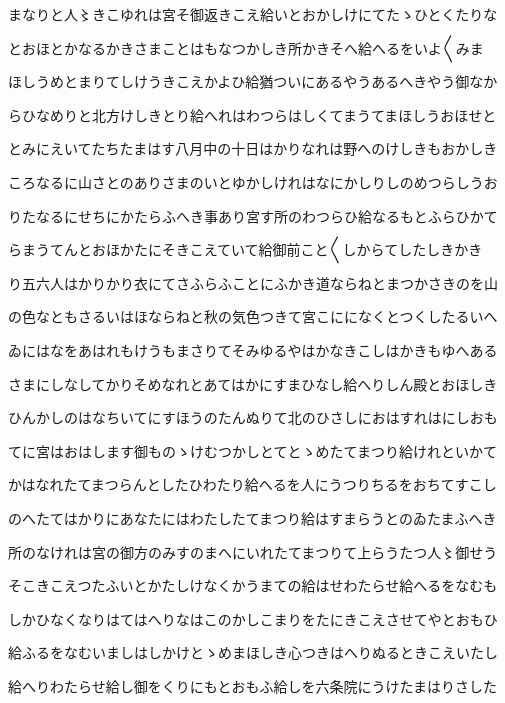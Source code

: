 \documentclass[a4paper,11pt,landscape]{ltjtarticle}
\begin{document}
\par\medskip
まなりと人〻きこゆれは宮そ御返きこえ給いとおかしけにてたゝひとくたりな
\par\medskip
とおほとかなるかきさまことはもなつかしき所かきそへ給へるをいよ〱みま
\par\medskip
ほしうめとまりてしけうきこえかよひ給猶ついにあるやうあるへきやう御なか
\par\medskip
らひなめりと北方けしきとり給へれはわつらはしくてまうてまほしうおほせと
\par\medskip
とみにえいてたちたまはす八月中の十日はかりなれは野へのけしきもおかしき
\par\medskip
ころなるに山さとのありさまのいとゆかしけれはなにかしりしのめつらしうお
\par\medskip
りたなるにせちにかたらふへき事あり宮す所のわつらひ給なるもとふらひかて
\par\medskip
らまうてんとおほかたにそきこえていて給御前こと〱しからてしたしきかき
\par\medskip
り五六人はかりかり衣にてさふらふことにふかき道ならねとまつかさきのを山
\par\medskip
の色なともさるいはほならねと秋の気色つきて宮こにになくとつくしたるいへ
\par\medskip
ゐにはなをあはれもけうもまさりてそみゆるやはかなきこしはかきもゆへある
\par\medskip
さまにしなしてかりそめなれとあてはかにすまひなし給へりしん殿とおほしき
\par\medskip
ひんかしのはなちいてにすほうのたんぬりて北のひさしにおはすれはにしおも
\par\medskip
てに宮はおはします御ものゝけむつかしとてとゝめたてまつり給けれといかて
\par\medskip
かはなれたてまつらんとしたひわたり給へるを人にうつりちるをおちてすこし
\par\medskip
のへたてはかりにあなたにはわたしたてまつり給はすまらうとのゐたまふへき
\par\medskip
所のなけれは宮の御方のみすのまへにいれたてまつりて上らうたつ人〻御せう
\par\medskip
そこきこえつたふいとかたしけなくかうまての給はせわたらせ給へるをなむも
\par\medskip
しかひなくなりはてはへりなはこのかしこまりをたにきこえさせてやとおもひ
\par\medskip
給ふるをなむいましはしかけとゝめまほしき心つきはへりぬるときこえいたし
\par\medskip
給へりわたらせ給し御をくりにもとおもふ給しを六条院にうけたまはりさした
\end{document}
